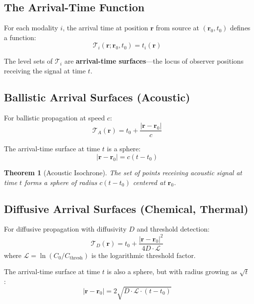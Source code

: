 \documentclass[11pt,a4paper]{article}
\newtheorem{theorem}{Theorem}[section]
\theoremstyle{remark}
\newcommand{\rxnpos}{\mathbf{r}_0}
\newcommand{\rxntime}{t_0}
\newcommand{\obspos}{\mathbf{r}}
\begin{document}
\subsection{The Arrival-Time Function}

For each modality $i$, the arrival time at position $\obspos$ from source at $(\rxnpos, \rxntime)$ defines a function:
\begin{equation}
    \mathcal{T}_i(\obspos; \rxnpos, \rxntime) = t_i(\obspos)
\end{equation}

The level sets of $\mathcal{T}_i$ are \textbf{arrival-time surfaces}---the locus of observer positions receiving the signal at time $t$.

\subsection{Ballistic Arrival Surfaces (Acoustic)}

For ballistic propagation at speed $c$:
\begin{equation}
    \mathcal{T}_A(\obspos) = \rxntime + \frac{|\obspos - \rxnpos|}{c}
\end{equation}

The arrival-time surface at time $t$ is a sphere:
\begin{equation}
    |\obspos - \rxnpos| = c(t - \rxntime)
\end{equation}

\begin{theorem}[Acoustic Isochrone]
\label{thm:acoustic_iso}
The set of points receiving acoustic signal at time $t$ forms a sphere of radius $c(t-\rxntime)$ centered at $\rxnpos$.
\end{theorem}

\subsection{Diffusive Arrival Surfaces (Chemical, Thermal)}

For diffusive propagation with diffusivity $D$ and threshold detection:
\begin{equation}
    \mathcal{T}_D(\obspos) = \rxntime + \frac{|\obspos - \rxnpos|^2}{4D \cdot \mathcal{L}}
\end{equation}
where $\mathcal{L} = \ln(C_0/C_{\text{thresh}})$ is the logarithmic threshold factor.

The arrival-time surface at time $t$ is also a sphere, but with radius growing as $\sqrt{t}$:
\begin{equation}
    |\obspos - \rxnpos| = 2\sqrt{D \cdot \mathcal{L} \cdot (t - \rxntime)}
\end{equation}
\end{document}
